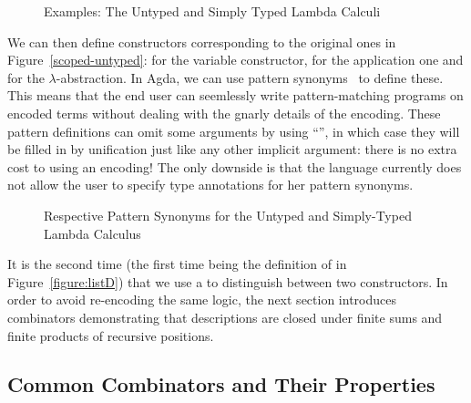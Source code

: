 \begin{figure}[h]
\begin{minipage}{0.45\textwidth}
\end{minipage}\hspace{2em}
\begin{minipage}{0.45\textwidth}
\end{minipage}
\caption{Examples: The Untyped and Simply Typed Lambda Calculi}
\end{figure}

We can then define constructors corresponding
to the original ones in Figure~\ref{scoped-untyped}: 
for  the variable constructor,  for  the
application one and  for  the $\lambda$-abstraction.
In Agda, we can use pattern synonyms~\cite{Pickering:patsyn} to define these.
This means that the end user can seemlessly write pattern-matching programs on
encoded terms without dealing with the gnarly details of the encoding.
These pattern definitions can omit some arguments by using ``\AS{\_}'',
in which case they will be filled in by unification just like any other
implicit argument: there is no extra cost to using an encoding!
The only downside is that the language currently does not allow the
user to specify type annotations for her pattern synonyms.

\begin{figure}[h]
\begin{minipage}{0.40\textwidth}
\end{minipage}\hspace{2em}
\begin{minipage}{0.50\textwidth}
\end{minipage}
\caption{Respective Pattern Synonyms for the Untyped and Simply-Typed Lambda Calculus}
\end{figure}

It is the second time (the first time being the definition of
 in Figure~\ref{figure:listD}) that we use a
 to distinguish between two constructors. In order
to avoid re-encoding the same logic,
the next section introduces combinators demonstrating that
descriptions are closed under finite sums and finite products
of recursive positions.

\subsection{Common Combinators and Their Properties}\label{desccomb}

